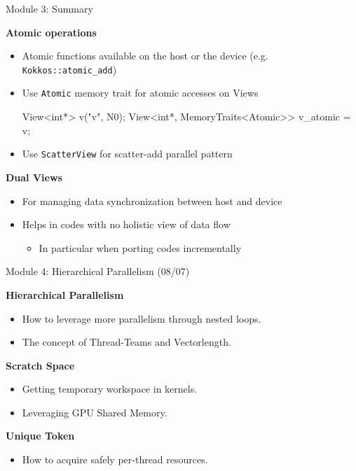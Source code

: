 \begin{frame}[fragile]{Module 3: Summary}

	\textbf{Atomic operations}
        \begin{itemize}
                \item Atomic functions available on the host or the device (e.g. \texttt{Kokkos::atomic\_add})
                \item {Use \texttt{Atomic} memory trait for atomic accesses on Views
\begin{code}[keywords={View,int,MemoryTraits,Atomic}]
View<int*> v("v", N0);
View<int*, MemoryTraits<Atomic>> v_atomic = v;
\end{code}}
                \item Use \texttt{ScatterView} for scatter-add parallel pattern
        \end{itemize}

        \vspace{10pt}
	\textbf{Dual Views}
        \begin{itemize}
                \item For managing data synchronization between host and device
 		\item Helps in codes with no holistic view of data flow
		\begin{itemize}
                   \item In particular when porting codes incrementally
                \end{itemize}
        \end{itemize}

\end{frame}
\begin{frame}{Module 4: Hierarchical Parallelism (08/07)}

	\vspace{5pt}
	\textbf{Hierarchical Parallelism}
	\begin{itemize}
        \item How to leverage more parallelism through nested loops.
        \item The concept of Thread-Teams and Vectorlength.
	\end{itemize}

	\vspace{5pt}
	\textbf{Scratch Space}
	\begin{itemize}
        \item Getting temporary workspace in kernels.
        \item Leveraging GPU Shared Memory.
	\end{itemize}

        \vspace{5pt}
        \textbf{Unique Token}
        \begin{itemize}
        \item How to acquire safely per-thread resources.
        \end{itemize}

\end{frame}

